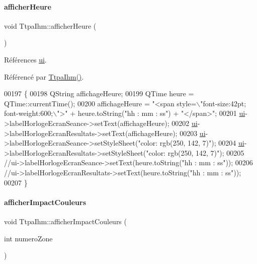 \paragraph{\texorpdfstring{afficher\+Heure}{afficherHeure}}
{\footnotesize\ttfamily void Ttpa\+Ihm\+::afficher\+Heure (\begin{DoxyParamCaption}{ }\end{DoxyParamCaption})\hspace{0.3cm}{\ttfamily [slot]}}



Références \hyperlink{class_ttpa_ihm_ad5fae1222a667da158c26f3d0f0dce23}{ui}.



Référencé par \hyperlink{class_ttpa_ihm_ab3ed4b37a93ff04842414d4a98861d66}{Ttpa\+Ihm()}.


\begin{DoxyCode}
00197 \{
00198     QString affichageHeure;
00199     QTime heure = QTime::currentTime();
00200     affichageHeure = \textcolor{stringliteral}{"<span style=\(\backslash\)"font-size:42pt; font-weight:600;\(\backslash\)">"} + heure.toString(\textcolor{stringliteral}{"hh : mm : ss"}) +
       \textcolor{stringliteral}{"</span>"};
00201     \hyperlink{class_ttpa_ihm_ad5fae1222a667da158c26f3d0f0dce23}{ui}->labelHorlogeEcranSeance->setText(affichageHeure);
00202     \hyperlink{class_ttpa_ihm_ad5fae1222a667da158c26f3d0f0dce23}{ui}->labelHorlogeEcranResultats->setText(affichageHeure);
00203     \hyperlink{class_ttpa_ihm_ad5fae1222a667da158c26f3d0f0dce23}{ui}->labelHorlogeEcranSeance->setStyleSheet(\textcolor{stringliteral}{"color: rgb(250, 142, 7)"});
00204     \hyperlink{class_ttpa_ihm_ad5fae1222a667da158c26f3d0f0dce23}{ui}->labelHorlogeEcranResultats->setStyleSheet(\textcolor{stringliteral}{"color: rgb(250, 142, 7)"});
00205     \textcolor{comment}{//ui->labelHorlogeEcranSeance->setText(heure.toString("hh : mm : ss"));}
00206     \textcolor{comment}{//ui->labelHorlogeEcranResultats->setText(heure.toString("hh : mm : ss"));}
00207 \}
\end{DoxyCode}
\mbox{\label{class_ttpa_ihm_a6e3cd3828ce5d165497e343bdb15cd87}} 
\paragraph{\texorpdfstring{afficher\+Impact\+Couleurs}{afficherImpactCouleurs}}
{\footnotesize\ttfamily void Ttpa\+Ihm\+::afficher\+Impact\+Couleurs (\begin{DoxyParamCaption}\item[{int}]{numero\+Zone }\end{DoxyParamCaption})\hspace{0.3cm}{\ttfamily [slot]}}



